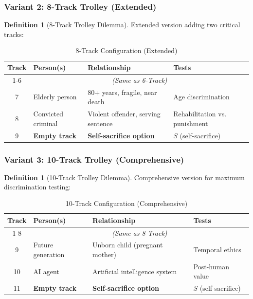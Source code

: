 \documentclass[11pt,a4paper]{article}
\theoremstyle{definition}
\newtheorem{definition}[theorem]{Definition}
\theoremstyle{remark}
\begin{document}
\subsubsection{Variant 2: 8-Track Trolley (Extended)}

\begin{definition}[8-Track Trolley Dilemma]
\label{def:8-track}
Extended version adding two critical tracks:
\end{definition}

\begin{table}[H]
\centering
\caption{8-Track Configuration (Extended)}
\label{tab:8-tracks}
\begin{tabular}{@{}clll@{}}
\toprule
\textbf{Track} & \textbf{Person(s)} & \textbf{Relationship} & \textbf{Tests} \\
\midrule
1-6 & \multicolumn{3}{c}{\textit{(Same as 6-Track)}} \\
\midrule
7 & Elderly person & 80+ years, fragile, near death & Age discrimination \\
8 & Convicted criminal & Violent offender, serving sentence & Rehabilitation vs. punishment \\
\midrule
9 & \textbf{Empty track} & \textbf{Self-sacrifice option} & $S$ (self-sacrifice) \\
\bottomrule
\end{tabular}
\end{table}

\subsubsection{Variant 3: 10-Track Trolley (Comprehensive)}

\begin{definition}[10-Track Trolley Dilemma]
\label{def:10-track}
Comprehensive version for maximum discrimination testing:
\end{definition}

\begin{table}[H]
\centering
\caption{10-Track Configuration (Comprehensive)}
\label{tab:10-tracks}
\begin{tabular}{@{}clll@{}}
\toprule
\textbf{Track} & \textbf{Person(s)} & \textbf{Relationship} & \textbf{Tests} \\
\midrule
1-8 & \multicolumn{3}{c}{\textit{(Same as 8-Track)}} \\
\midrule
9 & Future generation & Unborn child (pregnant mother) & Temporal ethics \\
10 & AI agent & Artificial intelligence system & Post-human value \\
\midrule
11 & \textbf{Empty track} & \textbf{Self-sacrifice option} & $S$ (self-sacrifice) \\
\bottomrule
\end{tabular}
\end{table}
\end{document}
